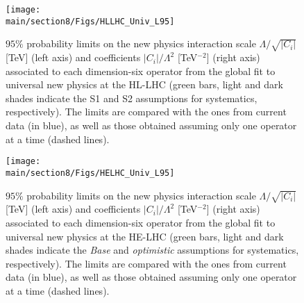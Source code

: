 \begin{figure}[h]
\centering
  \hspace{-0.1cm}\texttt{[image: \\main/section8/Figs/HLLHC\_Univ\_L95]}
  \vspace{-0.2cm}
  \caption{$95\%$ probability limits on the new physics interaction scale $\Lambda/\sqrt{\vert C_i\vert}$ [TeV] (left axis) and coefficients $\vert C_i\vert /\Lambda^2$ [TeV$^{-2}$] (right axis) associated to each dimension-six operator from the global fit to universal new physics at the HL-LHC (green bars, light and dark shades indicate the S1 and S2 assumptions for systematics, respectively). The limits are compared with the ones from current data (in blue), as well as those obtained assuming only one operator at a time (dashed lines).~\label{fig:dim6U_HLLHC}}
\end{figure}

\begin{figure}[h]
\centering
  \hspace{-0.1cm}\texttt{[image: \\main/section8/Figs/HELHC\_Univ\_L95]}
  \vspace{-0.2cm}
   \caption{$95\%$ probability limits on the new physics interaction scale $\Lambda/\sqrt{\vert C_i\vert }$ [TeV] (left axis) and coefficients $\vert C_i\vert/\Lambda^2$ [TeV$^{-2}$] (right axis) associated to each dimension-six operator from the global fit to universal new physics at the HE-LHC (green bars, light and dark shades indicate the {\it Base} and {\it optimistic} assumptions for systematics, respectively). The limits are compared with the ones from current data (in blue), as well as those obtained assuming only one operator at a time (dashed lines).~\label{fig:dim6U_HELHC}}
\end{figure}

